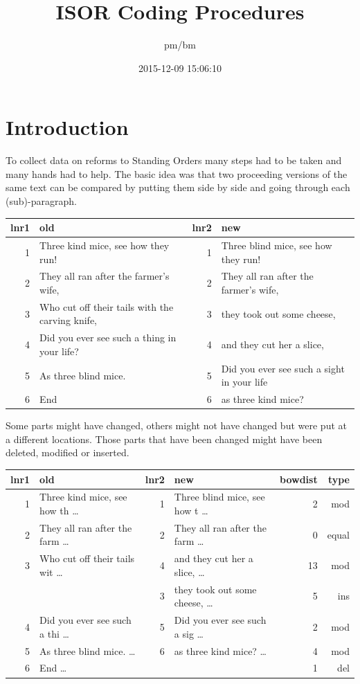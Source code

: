 \documentclass[10pt,]{article}
\title{ISOR Coding Procedures}
\author{pm/bm}
\date{2015-12-09 15:06:10}
\begin{document}
\maketitle

{
\hypersetup{linkcolor=black}
\setcounter{tocdepth}{2}
\tableofcontents
}
\makeatletter
\newcommand{\justified}{%
  \rightskip\z@skip%
  \leftskip\z@skip} \makeatother

\newpage

\section{Introduction}\label{introduction}

To collect data on reforms to Standing Orders many steps had to be taken
and many hands had to help. The basic idea was that two proceeding
versions of the same text can be compared by putting them side by side
and going through each (sub)-paragraph.

\begin{longtable}[c]{@{}rlrl@{}}
\toprule
lnr1 & old & lnr2 & new\tabularnewline
\midrule
\endhead
1 & Three kind mice, see how they run! & 1 & Three blind mice, see how
they run!\tabularnewline
2 & They all ran after the farmer's wife, & 2 & They all ran after the
farmer's wife,\tabularnewline
3 & Who cut off their tails with the carving knife, & 3 & they took out
some cheese,\tabularnewline
4 & Did you ever see such a thing in your life? & 4 & and they cut her a
slice,\tabularnewline
5 & As three blind mice. & 5 & Did you ever see such a sight in your
life\tabularnewline
6 & End & 6 & as three kind mice?\tabularnewline
\bottomrule
\end{longtable}

Some parts might have changed, others might not have changed but were
put at a different locations. Those parts that have been changed might
have been deleted, modified or inserted.

\begin{longtable}[c]{@{}rlrlrr@{}}
\toprule
lnr1 & old & lnr2 & new & bowdist & type\tabularnewline
\midrule
\endhead
1 & Three kind mice, see how th \ldots{} & 1 & Three blind mice, see how
t \ldots{} & 2 & mod\tabularnewline
2 & They all ran after the farm \ldots{} & 2 & They all ran after the
farm \ldots{} & 0 & equal\tabularnewline
3 & Who cut off their tails wit \ldots{} & 4 & and they cut her a slice,
\ldots{} & 13 & mod\tabularnewline
& & 3 & they took out some cheese, \ldots{} & 5 & ins\tabularnewline
4 & Did you ever see such a thi \ldots{} & 5 & Did you ever see such a
sig \ldots{} & 2 & mod\tabularnewline
5 & As three blind mice. \ldots{} & 6 & as three kind mice? \ldots{} & 4
& mod\tabularnewline
6 & End \ldots{} & & & 1 & del\tabularnewline
\bottomrule
\end{longtable}
\end{document}
